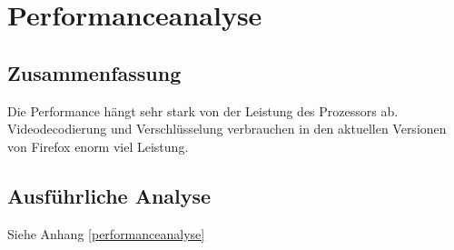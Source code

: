 \chapter{Performanceanalyse}
	\section{Zusammenfassung}
		Die Performance hängt sehr stark von der Leistung des Prozessors ab. Videodecodierung und Verschlüsselung verbrauchen in den aktuellen Versionen von Firefox enorm viel Leistung.
		
	\section{Ausführliche Analyse}
		Siehe Anhang \ref{performanceanalyse}
	